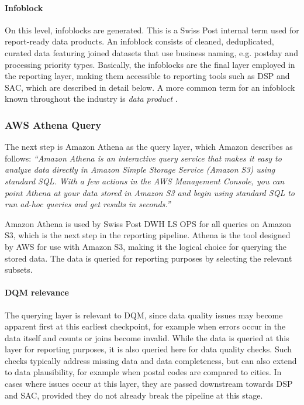 \paragraph{Infoblock}
\label{SolutionLandscapeInfoblock}

On this level, \glspl{infoblock} are generated. This is a Swiss Post internal term used for report-ready data products. An infoblock consists of cleaned, deduplicated, curated data featuring joined datasets that use business naming, e.g. \gls{postday} and processing priority types. Basically, the infoblocks are the final layer employed in the reporting layer, making them accessible to reporting tools such as \gls{DSP} and \gls{SAC}, which are described in detail below. A more common term for an infoblock known throughout the industry is \textit{data product} \cite{alation_data_product, ibm_data_product}.



\subsubsection*{AWS Athena Query}
\label{SolutionAthenaQuery}

The next step is Amazon Athena as the query layer, which Amazon describes as follows: \textit{“Amazon Athena is an interactive query service that makes it easy to analyze data directly in Amazon Simple Storage Service (Amazon S3) using standard SQL. With a few actions in the AWS Management Console, you can point Athena at your data stored in Amazon S3 and begin using standard SQL to run ad-hoc queries and get results in seconds.” \cite{aws_athena_docs}}

Amazon Athena is used by Swiss Post DWH LS OPS for all queries on Amazon S3, which is the next step in the reporting pipeline. Athena is the tool designed by AWS for use with Amazon S3, making it the logical choice for querying the stored data. The data is queried for reporting purposes by selecting the relevant subsets.



\paragraph{DQM relevance}
The querying layer is relevant to DQM, since data quality issues may become apparent first at this earliest checkpoint, for example when errors occur in the data itself and counts or joins become invalid. While the data is queried at this layer for reporting purposes, it is also queried here for data quality checks. Such checks typically address missing data and data completeness, but can also extend to data plausibility, for example when postal codes are compared to cities. In cases where issues occur at this layer, they are passed downstream towards DSP and SAC, provided they do not already break the pipeline at this stage.


